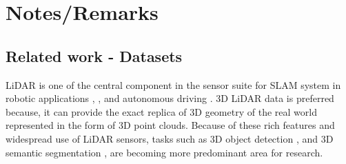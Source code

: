 

\chapter{Notes/Remarks}
\section{Related work - Datasets}
LiDAR is one of the central component in the sensor suite for SLAM system in robotic applications \cite{thrun2006stanley}, \cite{patz2008practical}, \cite{hess20162dSLAM} and autonomous driving \cite{li2016vehicle}.
3D LiDAR data is preferred because, it can provide the exact replica of 3D geometry of the real world represented in the form of 3D point clouds.
Because of these rich features and widespread use of LiDAR sensors, tasks such as 3D object detection \cite{zhou2018voxelnet}, \cite{PIXOR} and 3D semantic segmentation \cite{qi2017pointnet++}, \cite{3Dmininet} are becoming more predominant area for research.

